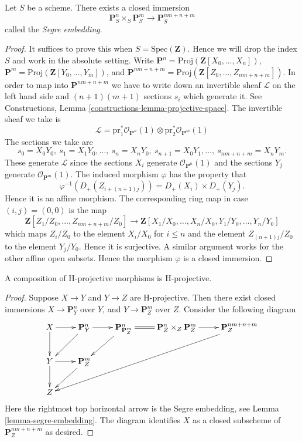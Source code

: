 \begin{lemma}
\label{lemma-segre-embedding}
Let $S$ be a scheme. There exists a closed immersion
$$
\mathbf{P}^n_S \times_S \mathbf{P}^m_S
\longrightarrow
\mathbf{P}^{nm + n + m}_S
$$
called the {\it Segre embedding}.
\end{lemma}

\begin{proof}
It suffices to prove this when $S = \text{Spec}(\mathbf{Z})$.
Hence we will drop the index $S$ and work in the absolute setting.
Write $\mathbf{P}^n = \text{Proj}(\mathbf{Z}[X_0, \ldots, X_n])$,
$\mathbf{P}^m = \text{Proj}(\mathbf{Z}[Y_0, \ldots, Y_m])$,
and
$\mathbf{P}^{nm + n + m} =
\text{Proj}(\mathbf{Z}[Z_0, \ldots, Z_{nm + n + m}])$.
In order to map into $\mathbf{P}^{nm + n + m}$ we have to
write down an invertible sheaf $\mathcal{L}$ on the left hand
side and $(n + 1)(m + 1)$ sections $s_i$ which generate it.
See Constructions, Lemma \ref{constructions-lemma-projective-space}.
The invertible sheaf we take is
$$
\mathcal{L} =
\text{pr}_1^*\mathcal{O}_{\mathbf{P}^n}(1)
\otimes
\text{pr}_2^*\mathcal{O}_{\mathbf{P}^m}(1)
$$
The sections we take are
$$
s_0 = X_0Y_0, \ s_1 = X_1Y_0, \ldots, \ s_n = X_nY_0, \ 
s_{n + 1} = X_0Y_1, \ldots, \ s_{nm + n + m} = X_nY_m.
$$
These generate $\mathcal{L}$ since the sections $X_i$ generate
$\mathcal{O}_{\mathbf{P}^n}(1)$ and the sections $Y_j$ generate
$\mathcal{O}_{\mathbf{P}^m}(1)$. The induced morphism
$\varphi$ has the property that
$$
\varphi^{-1}(D_{+}(Z_{i + (n + 1)j})) = D_{+}(X_i) \times D_{+}(Y_j).
$$
Hence it is an affine morphism. The corresponding ring map in case
$(i, j) = (0, 0)$ is the map
$$
\mathbf{Z}[Z_1/Z_0, \ldots, Z_{nm + n + m}/Z_0]
\longrightarrow
\mathbf{Z}[X_1/X_0, \ldots, X_n/X_0, Y_1/Y_0, \ldots, Y_n/Y_0]
$$
which maps $Z_i/Z_0$ to the element $X_i/X_0$ for $i \leq n$ and
the element $Z_{(n + 1)j}/Z_0$ to the element $Y_j/Y_0$. Hence it
is surjective. A similar argument works for the other affine
open subsets. Hence the morphism $\varphi$ is a closed immersion.
\end{proof}

\begin{lemma}
\label{lemma-H-projective-composition}
A composition of H-projective morphisms is H-projective.
\end{lemma}

\begin{proof}
Suppose $X \to Y$ and $Y \to Z$ are H-projective.
Then there exist closed immersions $X \to \mathbf{P}^n_Y$
over $Y$, and $Y \to \mathbf{P}^m_Z$ over $Z$.
Consider the following diagram
$$
\xymatrix{
X \ar[r] \ar[d] &
\mathbf{P}^n_Y \ar[r] \ar[dl] &
\mathbf{P}^n_{\mathbf{P}^m_Z} \ar[dl] \ar@{=}[r] &
\mathbf{P}^n_Z \times_Z \mathbf{P}^m_Z \ar[r] &
\mathbf{P}^{nm + n + m}_Z \ar[ddllll] \\
Y \ar[r] \ar[d] & \mathbf{P}^m_Z \ar[dl] & \\
Z & &
}
$$
Here the rightmost top horizontal arrow is the Segre embedding,
see Lemma \ref{lemma-segre-embedding}. The diagram identifies
$X$ as a closed subscheme of $\mathbf{P}^{nm + n + m}_Z$ as desired.
\end{proof}

